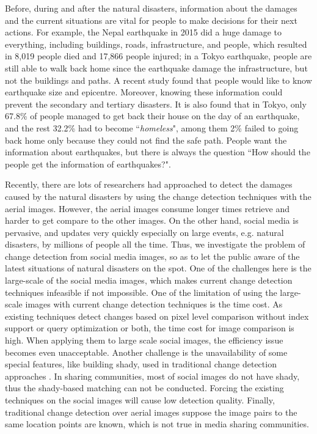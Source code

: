 \documentclass[runningheads,a4paper]{llncs}
\begin{document}
Before, during and after the natural disasters, information about the damages and the current situations are vital for people to make decisions for their next actions. For example, the Nepal earthquake in 2015 did a huge damage to everything, including buildings, roads, infrastructure, and people, which resulted in 8,019 people died and 17,866 people injured; in a Tokyo earthquake, people are still able to walk back home since the earthquake damage the infrastructure, but not the buildings and paths. A recent study \cite{110009470680} found that people would like to know earthquake size and epicentre.
Moreover, knowing these information could prevent the secondary and tertiary disasters. It is also found that in Tokyo, only 67.8\% of people managed to get back their house on the day of an earthquake, and the rest 32.2\% had to become ``\emph{homeless}", among them 2\% failed to going back home only because they could not find the safe path. People want the information about earthquakes, but there is always the question ``How should the people get the information of earthquakes?".

Recently, there are lots of researchers had approached to detect the damages caused by the natural disasters by using the change detection techniques with the aerial images. However, the aerial images consume longer times retrieve and harder to get compare to the other images. On the other hand, social media is pervasive, and updates very quickly especially on large events, e.g. natural disasters, by millions of people all the time. Thus, we investigate the problem of change detection from social media images, so as to let the public aware of the latest situations of natural disasters on the spot. One of the challenges here is the large-scale of the social media images, which makes current change detection techniques infeasible if not impossible. One of the limitation of using the large-scale images with current change detection techniques is the time cost. As existing techniques detect changes based on pixel level comparison \cite{ilsever2012two} without index support or query optimization or both, the time cost for image comparison is high. When applying them to large scale social images, the efficiency issue becomes even unacceptable. Another challenge is the unavailability of some special features, like building shady, used in traditional change detection approaches \cite{turker2008building}. In sharing communities, most of social images do not have shady, thus the shady-based matching can not be conducted. Forcing the existing techniques on the social images will cause low detection quality. Finally, traditional change detection over aerial images suppose the image pairs to the same location points are known, which is not true in media sharing communities.
\end{document}
